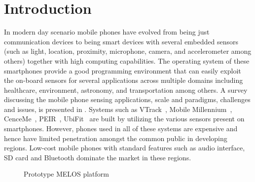 \documentclass[10pt]{sigplan-proc-varsize}
\newcommand{\melos}{MELOS }
\begin{document}
\section{Introduction}
  \label{sec:intro}
%

In modern day scenario mobile phones have evolved from being just communication devices to being smart devices with several embedded sensors (such as light, location, proximity, microphone, camera, and accelerometer among others) together with high computing capabilities. The operating system of these smartphones provide a good programming environment that can easily exploit the on-board sensors for several applications across multiple domains including healthcare, environment, astronomy, and transportation among others. A survey discussing the mobile phone sensing applications, scale and paradigms, challenges and issues, is presented in \cite{mobilesurvey}. Systems such as VTrack~\cite{vtrack}, Mobile Millennium~\cite{mobilemillennium}, CenceMe~\cite{CenceMe}, PEIR~\cite{peir}, UbiFit~\cite{UbiFit} are built by utilizing the various sensors present on smartphones. However, phones used in all of these systems are expensive and hence have limited penetration amongst the common public in developing regions. Low-cost mobile phones with standard features such as audio interface, SD card and Bluetooth dominate the market in these regions. 

\begin{figure}
\centering
{}
\caption{Prototype \melos platform}
\label{fig:melosboard}
\vspace{-5mm}
\end{figure}
\end{document}
